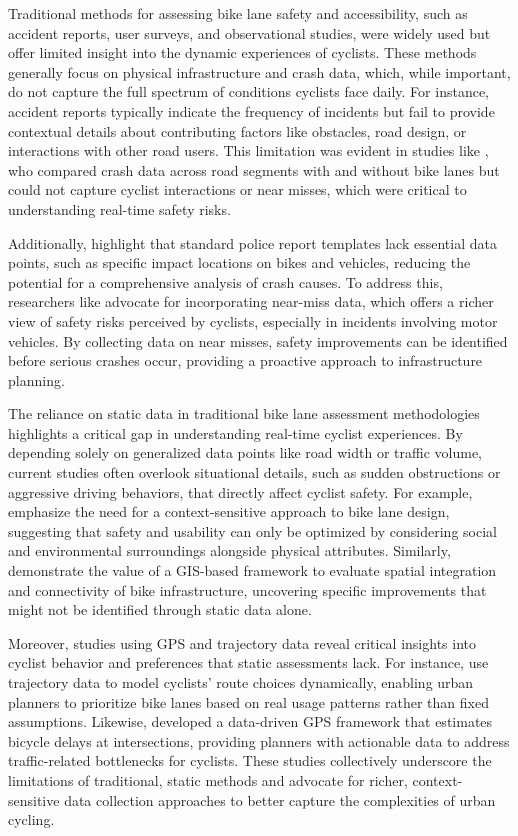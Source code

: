 Traditional methods for assessing bike lane safety and accessibility, such as accident reports, user surveys, and observational studies, were widely used but offer limited insight into the dynamic experiences of cyclists. These methods generally focus on physical infrastructure and crash data, which, while important, do not capture the full spectrum of conditions cyclists face daily. For instance, accident reports typically indicate the frequency of incidents but fail to provide contextual details about contributing factors like obstacles, road design, or interactions with other road users. This limitation was evident in studies like \citet{Pulugurtha:2015}, who compared crash data across road segments with and without bike lanes but could not capture cyclist interactions or near misses, which were critical to understanding real-time safety risks.

Additionally, \citet{Lusk:2015}  highlight that standard police report templates lack essential data points, such as specific impact locations on bikes and vehicles, reducing the potential for a comprehensive analysis of crash causes. To address this, researchers like \citet{Poulos:2017} advocate for incorporating near-miss data, which offers a richer view of safety risks perceived by cyclists, especially in incidents involving motor vehicles. By collecting data on near misses, safety improvements can be identified before serious crashes occur, providing a proactive approach to infrastructure planning.

The reliance on static data in traditional bike lane assessment methodologies highlights a critical gap in understanding real-time cyclist experiences. By depending solely on generalized data points like road width or traffic volume, current studies often overlook situational details, such as sudden obstructions or aggressive driving behaviors, that directly affect cyclist safety. For example, \citet{Dondi:2011} emphasize the need for a context-sensitive approach to bike lane design, suggesting that safety and usability can only be optimized by considering social and environmental surroundings alongside physical attributes. Similarly, \citet{Zochowska:2022} demonstrate the value of a GIS-based framework to evaluate spatial integration and connectivity of bike infrastructure, uncovering specific improvements that might not be identified through static data alone.

Moreover, studies using GPS and trajectory data reveal critical insights into cyclist behavior and preferences that static assessments lack. For instance, \citet{Liu:2022} use trajectory data to model cyclists' route choices dynamically, enabling urban planners to prioritize bike lanes based on real usage patterns rather than fixed assumptions. Likewise, \citet{Yuan:2023} developed a data-driven GPS framework that estimates bicycle delays at intersections, providing planners with actionable data to address traffic-related bottlenecks for cyclists. These studies collectively underscore the limitations of traditional, static methods and advocate for richer, context-sensitive data collection approaches to better capture the complexities of urban cycling.


